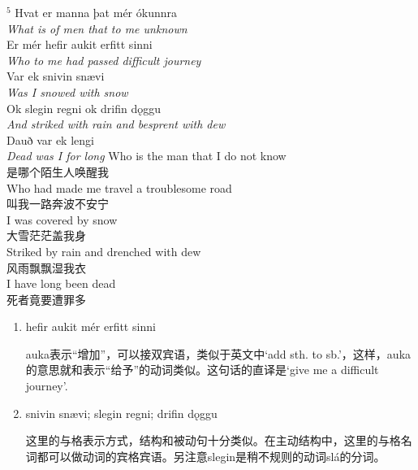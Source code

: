 \begin{paracol}{2}
    \noindent
    $^5$ Hvat er manna þat mér ókunnra\\
    \textit{What is of men that to me unknown}\\
    Er mér hefir aukit erfitt sinni\\
    \textit{Who to me had passed difficult journey}\\
    Var ek snivin snævi \\
    \textit{Was I snowed with snow}\\
    Ok slegin regni ok drifin dǫggu \\
    \textit{And striked with rain and besprent with dew}\\
    Dauð var ek lengi\\
    \textit{Dead was I for long}
    \switchcolumn
    \noindent
    Who is the man that I do not know\\
    是哪个陌生人唤醒我\\
    Who had made me travel a troublesome road\\
    叫我一路奔波不安宁\\
    I was covered by snow\\
    大雪茫茫盖我身\\
    Striked by rain and drenched with dew\\
    风雨飘飘湿我衣\\
    I have long been dead\\
    死者竟要遭罪多\\
\end{paracol}
\begin{grammar*}{}
    \begin{enumerate}[leftmargin=*]
        \item hefir aukit mér erfitt sinni

              auka表示“增加”，可以接双宾语，类似于英文中`add sth. to sb.'，这样，auka的意思就和表示“给予”的动词类似。这句话的直译是`give me a difficult journey'.

        \item snivin snævi; slegin regni; drifin dǫggu

              这里的与格表示方式，结构和被动句十分类似。在主动结构中，这里的与格名词都可以做动词的宾格宾语。另注意slegin是稍不规则的动词slá的分词。
    \end{enumerate}
\end{grammar*}

